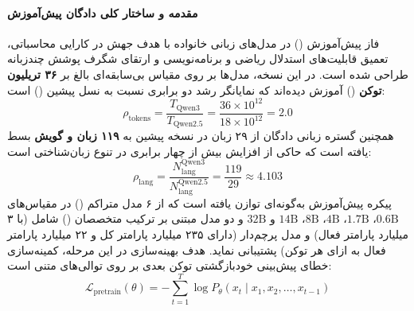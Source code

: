 \item {}

\paragraph*{مقدمه و ساختار کلی دادگان پیش‌آموزش}
فاز پیش‌آموزش () در مدل‌های زبانی خانواده  با هدف جهش در کارایی محاسباتی، تعمیق قابلیت‌های استدلال ریاضی و برنامه‌نویسی و ارتقای شگرف پوشش چندزبانه طراحی شده است. در این نسخه، مدل‌ها بر روی مقیاس بی‌سابقه‌ای بالغ بر \textbf{۳۶ تریلیون توکن} () آموزش دیده‌اند که نمایانگر رشد دو برابری نسبت به نسل پیشین () است:
\begin{equation}
    \rho_{\text{tokens}} = \frac{T_{\text{Qwen3}}}{T_{\text{Qwen2.5}}} = \frac{36 \times 10^{12}}{18 \times 10^{12}} = 2.0
\end{equation}
همچنین گستره زبانی دادگان از ۲۹ زبان در نسخه پیشین به \textbf{۱۱۹ زبان و گویش} بسط یافته است که حاکی از افزایش بیش از چهار برابری در تنوع زبان‌شناختی است:
\begin{equation}
    \rho_{\text{lang}} = \frac{N_{\text{lang}}^{\text{Qwen3}}}{N_{\text{lang}}^{\text{Qwen2.5}}} = \frac{119}{29} \approx 4.103
\end{equation}
پیکره پیش‌آموزش به‌گونه‌ای توازن یافته است که از ۶ مدل متراکم () در مقیاس‌های $0.6\text{B}$، $1.7\text{B}$، $4\text{B}$، $8\text{B}$، $14\text{B}$ و $32\text{B}$ و دو مدل مبتنی بر ترکیب متخصصان () شامل  (با ۳ میلیارد پارامتر فعال) و مدل پرچم‌دار  (دارای ۲۳۵ میلیارد پارامتر کل و ۲۲ میلیارد پارامتر فعال به ازای هر توکن) پشتیبانی نماید. هدف بهینه‌سازی در این مرحله، کمینه‌سازی خطای پیش‌بینی خودبازگشتی توکن بعدی بر روی توالی‌های متنی است:
\begin{equation}
    \mathcal{L}_{\text{pretrain}}(\theta) = - \sum_{t=1}^{T} \log P_\theta(x_t \mid x_1, x_2, \dots, x_{t-1})
\end{equation}

